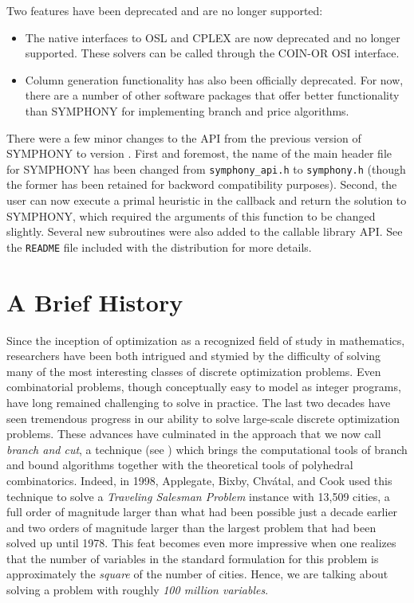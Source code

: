 Two features have been deprecated and are no longer supported:

\begin{itemize}

\item The native interfaces to OSL and CPLEX are now deprecated and no longer
supported. These solvers can be called through the COIN-OR OSI interface.

\item Column generation functionality has also been officially deprecated. For
now, there are a number of other software packages that offer better
functionality than SYMPHONY for implementing branch and price algorithms.

\end{itemize}

There were a few minor changes to the API from the previous version of
SYMPHONY to version \VER. First and foremost, the name of the main header file
for SYMPHONY has been changed from \texttt{symphony_api.h} to
\texttt{symphony.h} (though the former has been retained for backword
compatibility purposes). Second, the user can now execute a primal heuristic
in the  callback and return the solution to
SYMPHONY, which required the arguments of this function to be changed
slightly. Several new subroutines were also added to the callable library API.
See the \texttt{README} file included with the distribution for more details.

\section{A Brief History}
\label{history}

Since the inception of optimization as a recognized field of study in
mathematics, researchers have been both intrigued and stymied by the
difficulty of solving many of the most interesting classes of discrete
optimization problems. Even combinatorial problems, though conceptually easy
to model as integer programs, have long remained challenging to solve in
practice. The last two decades have seen tremendous progress in our ability to
solve large-scale discrete optimization problems. These advances have
culminated in the approach that we now call {\it branch and cut}, a technique
(see \cite{Grotschel84cut,padb:branc,hoff:LP}) which brings the computational
tools of branch and bound algorithms together with the theoretical tools of
polyhedral combinatorics. Indeed, in 1998, Applegate, Bixby, Chv\'atal, and
Cook used this technique to solve a {\em Traveling Salesman Problem} instance
with 13,509 cities, a full order of magnitude larger than what had been
possible just a decade earlier \cite{concorde} and two orders of magnitude
larger than the largest problem that had been solved up until 1978. This feat
becomes even more impressive when one realizes that the number of variables in
the standard formulation for this problem is approximately the {\em square} of
the number of cities. Hence, we are talking about solving a problem with
roughly {\em 100 million variables}.

